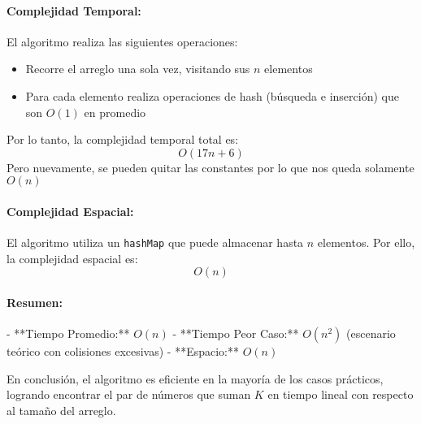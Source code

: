 \paragraph{Complejidad Temporal:}
El algoritmo realiza las siguientes operaciones:
\begin{itemize}
    \item Recorre el arreglo una sola vez, visitando sus $n$ elementos
    \item Para cada elemento realiza operaciones de hash (búsqueda e inserción) que son $O(1)$ en promedio
\end{itemize}
Por lo tanto, la complejidad temporal total es:
\[
O(17n+6)
\]
Pero nuevamente, se pueden quitar las constantes por lo que nos queda solamente $O(n)$

\paragraph{Complejidad Espacial:}
El algoritmo utiliza un \texttt{hashMap} que puede almacenar hasta $n$ elementos. Por ello, la complejidad espacial es:
\[
O(n)
\]

\paragraph{Resumen:}  
- **Tiempo Promedio:** \(O(n)\)  
- **Tiempo Peor Caso:** \(O(n^2)\) (escenario teórico con colisiones excesivas)  
- **Espacio:** \(O(n)\)

En conclusión, el algoritmo es eficiente en la mayoría de los casos prácticos, logrando encontrar el par de números que suman \(K\) en tiempo lineal con respecto al tamaño del arreglo.
